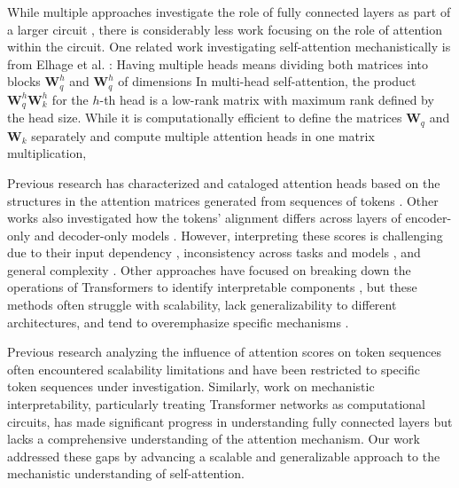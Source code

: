 While multiple approaches investigate the role of fully connected layers as part of a larger circuit \cite{Geva_Schuster_2021, Meng_Bau_2022, Geva_Caciularu_2022}, there is considerably less work focusing on the role of attention within the circuit. One related work investigating self-attention mechanistically is from Elhage et al. \cite{elhageMathematicalFrameworkTransformer2021}:
%
Having multiple heads means dividing both matrices into blocks $\bm{W}^h_q$ and $\bm{W}^h_q$ of dimensions In multi-head self-attention, the product $\bm{W}^h_q\bm{W}^h_k$ for the $h$-th head is a low-rank matrix with maximum rank defined by the head size.
%
While it is computationally efficient to define the matrices $\bm{W}_q$ and $\bm{W}_k$ separately and compute multiple attention heads in one matrix multiplication, 





Previous research has characterized and cataloged attention heads based on the structures in the attention matrices generated from sequences of tokens \citep{clarkWhatDoesBERT2019, kovalevaRevealingDarkSecrets2019, coenenVisualizingMeasuringGeometry2019, abnarQuantifyingAttentionFlow2020}. %
Other works also investigated how the tokens' alignment differs across layers of encoder-only and decoder-only models \citep{ethayarajhHowContextualAre2019}.
%
However, interpreting these scores is challenging due to their input dependency \citep{}, inconsistency across tasks and models \citep{}, and general complexity \citep{}.
%
Other approaches have focused on breaking down the operations of Transformers to identify interpretable components \citep{}, but these methods often struggle with scalability, lack generalizability to different architectures, and tend to overemphasize specific mechanisms \citep{}.

Previous research analyzing the influence of attention scores on token sequences often encountered scalability limitations and have been restricted to specific token sequences under investigation. Similarly, work on mechanistic interpretability, particularly treating Transformer networks as computational circuits, has made significant progress in understanding fully connected layers but lacks a comprehensive understanding of the attention mechanism.
Our work addressed these gaps by advancing a scalable and generalizable approach to the mechanistic understanding of self-attention.

